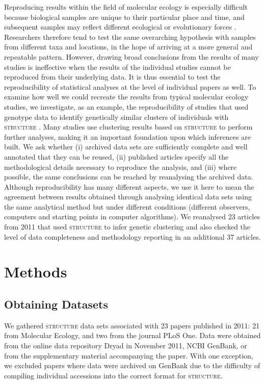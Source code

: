 Reproducing results within the field of molecular ecology is especially difficult because 
biological samples are unique to their particular place and time, and subsequent samples may 
reflect different ecological or evolutionary forces \citep{Wolkovich:2012}. Researchers 
therefore tend to test the same overarching hypothesis with samples from different taxa and 
locations, in the hope of arriving at a more general and repeatable pattern. However, drawing 
broad conclusions from the results of many studies is ineffective when the results of the 
individual studies cannot be reproduced from their underlying data. It is thus essential 
to test the reproducibility of statistical analyses at the level of individual papers as well. 
To examine how well we could recreate the results from typical molecular ecology studies, we 
investigate, as an example, the reproducibility of studies that used genotype data to identify 
genetically similar clusters of individuals with \textsc{structure} \citep{Pritchard:2000}. Many studies 
use clustering results based on \textsc{structure} to perform further analyses, making it an important 
foundation upon which inferences are built. We ask whether (i) archived data sets are sufficiently 
complete and well annotated that they can be reused, (ii) published articles specify all the 
methodological details necessary to reproduce the analysis, and (iii) where possible, the same 
conclusions can be reached by reanalysing the archived data. Although reproducibility has many 
different aspects, we use it here to mean the agreement between results obtained through analysing 
identical data sets using the same analytical method but under different conditions (different observers, 
computers and starting points in computer algorithms). We reanalysed 23 articles from 2011 that used 
\textsc{structure} to infer genetic clustering and also checked the level of data completeness and methodology 
reporting in an additional 37 articles.

\section{Methods}
\subsection{Obtaining Datasets}
We gathered \textsc{structure} data sets associated with 23 papers published in 2011: 21 from 
Molecular Ecology, and two from the journal PLoS One. Data were obtained from the online data 
repository Dryad \citep{Dryad} in November 2011, NCBI GenBank, or from the 
supplementary material accompanying the paper. With one exception, we excluded papers where 
data were archived on GenBank due to the difficulty of compiling individual accessions into 
the correct format for \textsc{structure}.

